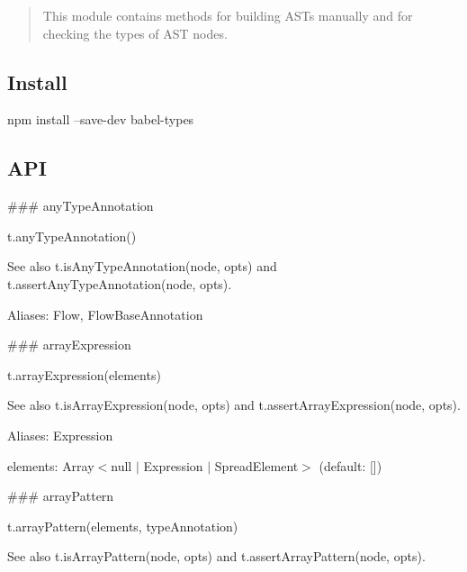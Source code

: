 \begin{quote}
This module contains methods for building A\+S\+Ts manually and for checking the types of A\+ST nodes. \end{quote}


\subsection*{Install}


\begin{DoxyCode}
npm install --save-dev babel-types
\end{DoxyCode}


\subsection*{A\+PI}

\#\#\# any\+Type\+Annotation 
\begin{DoxyCode}
t.anyTypeAnnotation()
\end{DoxyCode}


See also {\ttfamily t.\+is\+Any\+Type\+Annotation(node, opts)} and {\ttfamily t.\+assert\+Any\+Type\+Annotation(node, opts)}.

Aliases\+: {\ttfamily Flow}, {\ttfamily Flow\+Base\+Annotation}





\#\#\# array\+Expression 
\begin{DoxyCode}
t.arrayExpression(elements)
\end{DoxyCode}


See also {\ttfamily t.\+is\+Array\+Expression(node, opts)} and {\ttfamily t.\+assert\+Array\+Expression(node, opts)}.

Aliases\+: {\ttfamily Expression}


\begin{DoxyItemize}
\item {\ttfamily elements}\+: {\ttfamily Array$<$null $\vert$ Expression $\vert$ Spread\+Element$>$} (default\+: {\ttfamily \mbox{[}\mbox{]}}) 


\end{DoxyItemize}

\#\#\# array\+Pattern 
\begin{DoxyCode}
t.arrayPattern(elements, typeAnnotation)
\end{DoxyCode}


See also {\ttfamily t.\+is\+Array\+Pattern(node, opts)} and {\ttfamily t.\+assert\+Array\+Pattern(node, opts)}.

